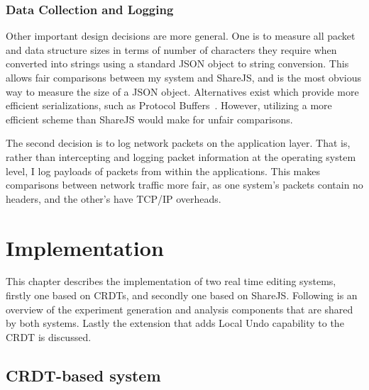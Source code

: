 \documentclass[12pt,a4paper,twoside,openright]{report}
\begin{document}

	\subsection{Data Collection and Logging} \label{sec:datacollectiondecisions}
	
	
	Other important design decisions are more general. One is to measure all packet and data structure sizes in terms of number of characters they require when converted into strings using a standard JSON object to string conversion. This allows fair comparisons between my system and ShareJS, and is the most obvious way to measure the size of a JSON object. Alternatives exist which provide more efficient serializations, such as Protocol Buffers~\cite{protobuf}. However, utilizing a more efficient scheme than ShareJS would make for unfair comparisons.
	
	The second decision is to log network packets on the application layer. That is, rather than intercepting and logging packet information at the operating system level, I log payloads of packets from within the applications. This makes comparisons between network traffic more fair, as one system's packets contain no headers, and the other's have TCP/IP overheads.



\chapter{Implementation} \label{sec:implementation}

This chapter describes the implementation of two real time editing systems, firstly one based on CRDTs, and secondly one based on ShareJS. Following is an overview of the experiment generation and analysis components that are shared by both systems. Lastly the extension that adds Local Undo capability to the CRDT is discussed.


\section{CRDT-based system} \label{sec:crdt}
\end{document}
